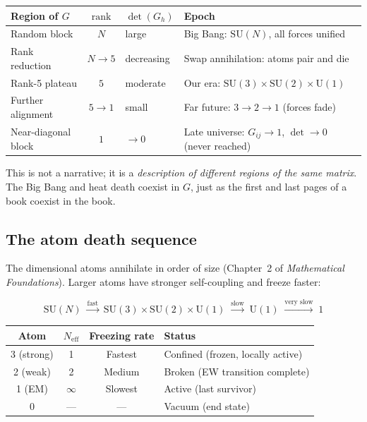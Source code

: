 \documentclass[12pt]{article}
\theoremstyle{remark}
\theoremstyle{definition}
\begin{document}
\begin{center}
\begin{tabular}{lcll}
\hline
Region of $G$ & $\text{rank}$ & $\det(G_h)$ & Epoch \\
\hline
Random block & $N$ & large & Big Bang: $\text{SU}(N)$, all forces unified \\
Rank reduction & $N \to 5$ & decreasing & Swap annihilation: atoms pair and die \\
Rank-5 plateau & $5$ & moderate & Our era: $\text{SU}(3)\!\times\!\text{SU}(2)\!\times\!\text{U}(1)$ \\
Further alignment & $5 \to 1$ & small & Far future: $3 \to 2 \to 1$ (forces fade) \\
Near-diagonal block & $1$ & $\to 0$ & Late universe: $G_{ij} \to 1$, $\det \to 0$ (never reached) \\
\hline
\end{tabular}
\end{center}

This is not a narrative; it is a \emph{description of different regions of the same matrix}. The Big Bang and heat death coexist in $G$, just as the first and last pages of a book coexist in the book.

\subsection{The atom death sequence}

The dimensional atoms annihilate in order of size (Chapter~2 of \textit{Mathematical Foundations}). Larger atoms have stronger self-coupling and freeze faster:

\begin{equation}
\text{SU}(N) \;\xrightarrow{\text{fast}}\; \text{SU}(3) \times \text{SU}(2) \times \text{U}(1) \;\xrightarrow{\text{slow}}\; \text{U}(1) \;\xrightarrow{\text{very slow}}\; 1
\end{equation}

\begin{center}
\begin{tabular}{cccl}
\hline
Atom & $N_\text{eff}$ & Freezing rate & Status \\
\hline
3 (strong) & 1 & Fastest & Confined (frozen, locally active) \\
2 (weak) & 2 & Medium & Broken (EW transition complete) \\
1 (EM) & $\infty$ & Slowest & Active (last survivor) \\
0 & --- & --- & Vacuum (end state) \\
\hline
\end{tabular}
\end{center}
\end{document}
